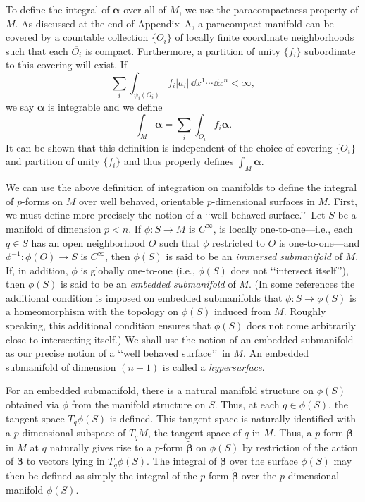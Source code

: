 To define the integral of \(\boldsymbol\alpha\) over all of \(M\), we use the
paracompactness property of \(M\). As discussed at the end of Appendix~A, a
paracompact manifold can be covered by a countable collection \(\{O_i\}\) of locally
finite coordinate neighborhoods such that each \(\overline{O_i}\) is compact.
Furthermore, a partition of unity \(\{f_i\}\) subordinate to this covering will exist.
If
\[
  \sum_i\int_{\psi_i(O_i)}f_i\lvert a_i\rvert\,\dd x^1\cdots \dd x^n<\infty,
\]
we say \(\boldsymbol\alpha\) is integrable and we define
\begin{equation}
  \int_M\boldsymbol\alpha=\sum_i\int_{O_i}f_i\boldsymbol\alpha.
  \tag{B.2.6}\label{eq:B.2.6}
\end{equation}
It can be shown that this definition is independent of the choice of covering
\(\{O_i\}\) and partition of unity \(\{f_i\}\) and thus properly defines
\(\int_M\boldsymbol\alpha\).

We can use the above definition of integration on manifolds to define the integral of
\(p\)-forms on \(M\) over well behaved, orientable \(p\)-dimensional surfaces in
\(M\). First, we must define more precisely the notion of a \lq\lq well behaved
surface.\rq\rq\ Let \(S\) be a manifold of dimension \(p<n\). If
\(\phi:S\to M\) is \(C^\infty\), is locally one-to-one---i.e., each \(q\in S\) has an
open neighborhood \(O\) such that \(\phi\) restricted to \(O\) is one-to-one---and
\(\phi^{-1}:\phi(O)\to S\) is \(C^\infty\), then \(\phi(S)\) is said to be an
\emph{immersed submanifold} of \(M\). If, in addition, \(\phi\) is globally
one-to-one (i.e., \(\phi(S)\) does not \lq\lq intersect itself\rq\rq), then
\(\phi(S)\) is said to be an \emph{embedded submanifold} of \(M\). (In some
references the additional condition is imposed on embedded submanifolds that
\(\phi:S\to\phi(S)\) is a homeomorphism with the topology on \(\phi(S)\) induced
from \(M\). Roughly speaking, this additional condition ensures that \(\phi(S)\) does
not come arbitrarily close to intersecting itself.) We shall use the notion of an
embedded submanifold as our precise notion of a \lq\lq well behaved surface\rq\rq\
in \(M\). An embedded submanifold of dimension \((n-1)\) is called a
\emph{hypersurface}.

For an embedded submanifold, there is a natural manifold structure on \(\phi(S)\)
obtained via \(\phi\) from the manifold structure on \(S\). Thus, at each
\(q\in\phi(S)\), the tangent space \(T_q\phi(S)\) is defined. This tangent space is
naturally identified with a \(p\)-dimensional subspace of \(T_qM\), the tangent space
of \(q\) in \(M\). Thus, a \(p\)-form \(\boldsymbol\beta\) in \(M\) at \(q\) naturally
gives rise to a \(p\)-form \(\widetilde{\boldsymbol\beta}\) on \(\phi(S)\) by
restriction of the action of \(\boldsymbol\beta\) to vectors lying in \(T_q\phi(S)\).
The integral of \(\boldsymbol\beta\) over the surface \(\phi(S)\) may then be defined
as simply the integral of the \(p\)-form \(\widetilde{\boldsymbol\beta}\) over the
\(p\)-dimensional manifold \(\phi(S)\).

